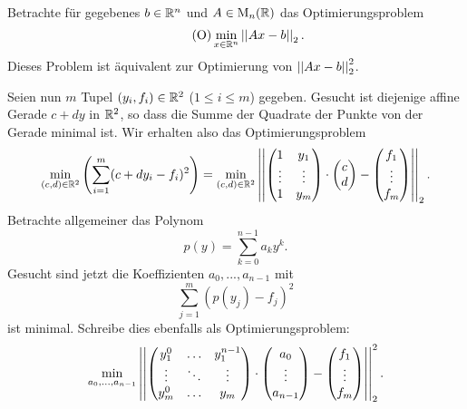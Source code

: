 Betrachte für gegebenes $b\in \mathbb{R}^n$ und $A\in \operatorname{M}_{n}(\mathbb{R})$ das Optimierungsproblem
\begin{equation}\label{1:opt}\tag{O}
\min_{x\in \mathbb{R}^n} \left|\left|Ax-b\right|\right|_2.
\end{equation}
Dieses Problem ist äquivalent zur Optimierung von $\left|\left|Ax-b\right|\right|_2^2$. \par
Seien nun $m$ Tupel $(y_i,f_i)\in \mathbb{R}^2$ ($1\leq i\leq m$) gegeben. Gesucht ist diejenige affine Gerade $c+dy$ in $\mathbb{R}^2$, so dass die Summe der Quadrate der Punkte von der Gerade minimal ist. Wir erhalten also das Optimierungsproblem
\[
\min_{(c,d)\in \mathbb{R}^2} \left(\sum_{i=1}^m(c+dy_i-f_i)^2\right) = \min_{(c,d)\in \mathbb{R}^2} \left|\left|\begin{pmatrix}1 &y_1\\\vdots &\vdots\\1&y_m\end{pmatrix}\cdot \begin{pmatrix}c\\d\end{pmatrix}-\begin{pmatrix}f_1\\\vdots\\f_m\end{pmatrix}\right|\right|_2.
\]
Betrachte allgemeiner das Polynom
\[
p(y) = \sum_{k=0}^{n-1}a_ky^k.
\]
Gesucht sind jetzt die Koeffizienten $a_0,...,a_{n-1}$ mit
\[
\sum_{j=1}^m\left(p(y_j)-f_j\right)^2
\]
ist minimal. Schreibe dies ebenfalls als Optimierungsproblem:
\[
\min_{a_0,...,a_{n-1}} \left|\left|\begin{pmatrix}y_1^0&\hdots&y_1^{n-1}\\\vdots&\ddots&\vdots\\y_m^0&\hdots& y_m\end{pmatrix}\cdot \begin{pmatrix}a_0\\\vdots\\a_{n-1}\end{pmatrix}-\begin{pmatrix}f_1\\\vdots\\f_m\end{pmatrix}\right|\right|_2^2.
\]
\lec
